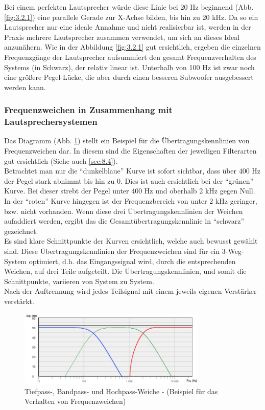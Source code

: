 Bei einem perfekten Lautsprecher würde diese Linie bei 20 Hz beginnend (Abb. \ref{fig:3.2.1}) eine parallele Gerade zur X-Achse bilden, bis hin zu 20 kHz.
Da so ein Lautsprecher nur eine ideale Annahme und nicht realisierbar ist, werden in der Praxis mehrere Lautsprecher zusammen verwendet, um sich an dieses Ideal anzunähern.
Wie in der Abbildung \ref{fig:3.2.1} gut ersichtlich, ergeben die einzelnen Frequenzgänge der Lautsprecher aufsummiert den gesamt Frequenzverhalten des Systems (in Schwarz), der relativ linear ist.
Unterhalb von 100 Hz ist zwar noch eine größere Pegel-Lücke, die aber durch einen besseren Subwoofer ausgebessert werden kann.

\subsubsection*{Frequenzweichen in Zusammenhang mit Lautsprechersystemen}
Das Diagramm (Abb. \ref{fig:3.2.2}) stellt ein Beispiel für die Übertragungskennlinien von Frequenzweichen dar.
In diesem sind die Eigenschaften der jeweiligen Filterarten gut ersichtlich (Siehe auch \ref{sec:8.4}).\\
Betrachtet man nur die \enquote{dunkelblaue} Kurve ist sofort sichtbar, dass über 400 Hz der Pegel stark abnimmt bis hin zu 0.
Dies ist auch ersichtlich bei der \enquote{grünen} Kurve.
Bei dieser strebt der Pegel unter 400 Hz und oberhalb 2 kHz gegen Null.
In der \enquote{roten} Kurve hingegen ist der Frequenzbereich von unter 2 kHz geringer, bzw. nicht vorhanden.
Wenn diese drei Übertragungskennlinien der Weichen aufaddiert werden, ergibt das die Gesamtübertragungskennlinie in \enquote{schwarz} gezeichnet.
\\
Es sind klare Schnittpunkte der Kurven ersichtlich, welche auch bewusst gewählt sind.
Diese Übertragungskennlinien der Frequenzweichen sind für ein 3-Weg-System optimiert, d.h. das Eingangssignal wird, durch die entsprechenden Weichen, auf drei Teile aufgeteilt.
Die Übertragungskennlinien, und somit die Schnittpunkte, variieren von System zu System.\\
Nach der Auftrennung wird jedes Teilsignal mit einem jeweils eigenen Verstärker verstärkt.
\begin{figure} [H]
	\centering
	\includegraphics[width=0.8\textwidth]{img/Grundlagen/Mehrweg-Lautsprechersysteme/Frequenzbereiche-Audio-Weiche-cut.jpg}
	\caption{Tiefpass-, Bandpass- und Hochpass-Weiche - (Beispiel für das Verhalten von Frequenzweichen)}
	\label{fig:3.2.2}
\end{figure}
